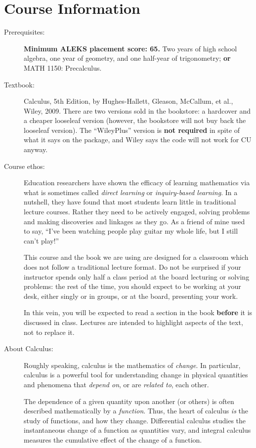 \documentclass[11pt]{article}
\begin{document}
\section*{Course Information}
\begin{description}
\item[Prerequisites:] \textbf{Minimum ALEKS placement score: 65.}  Two
  years of high school algebra, one year of geometry, and one
  half-year of trigonometry; \textbf{or} MATH 1150: Precalculus.

\item[Textbook:] Calculus, 5th Edition, by Hughes-Hallett, Gleason,
  McCallum, et al., Wiley, 2009.  There are two versions sold in the
  bookstore: a hardcover and a cheaper looseleaf version (however, the
  bookstore will not buy back the looseleaf version). The
  ``WileyPlus'' version is \textbf{not required} in spite of what it
  says on the package, and Wiley says the code will not work for CU
  anyway.

\item[Course ethos:] Education researchers have shown the efficacy of
  learning mathematics via what is sometimes called {\it direct
    learning} or {\it inquiry-based learning}. In a nutshell, they
  have found that most students learn little in traditional lecture
  courses. Rather they need to be actively engaged, solving problems
  and making discoveries and linkages as they go. As a friend of mine
  used to say, ``I've been watching people play guitar my whole life,
  but I still can't play!''

  This course and the book we are using are designed for a classroom
  which does not follow a traditional lecture format. Do not be
  surprised if your instructor spends only half a class period at the
  board lecturing or solving problems: the rest of the time, you
  should expect to be working at your desk, either singly or in
  groups, or at the board, presenting your work.

  In this vein, you will be expected to read a section in the book
  {\bf before} it is discussed in class.  Lectures are intended to
  highlight aspects of the text, not to replace it.

\item[About Calculus:] Roughly speaking, calculus is the mathematics of
  {\it change}.  In particular, calculus is a powerful tool for
  understanding change in physical quantities and phenomena that {\it
    depend on}, or are {\it related to}, each other.

  The dependence of a given quantity upon another (or others) is often
  described mathematically by a {\it function}.  Thus, the heart of
  calculus {\it is} the study of functions, and how they
  change. Differential calculus studies the instantaneous change of a
  function as quantities vary, and integral calculus measures the
  cumulative effect of the change of a function.


\end{description}
\end{document}
